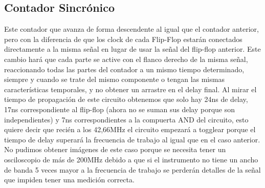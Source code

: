  



\subsection*{Contador Sincrónico}
Este contador que avanza de forma descendente al igual que el contador anterior, pero con la diferencia de que los clock de cada Flip-Flop estarán conectados directamente a la misma señal en lugar de usar la señal del flip-flop anterior. Este cambio hará que cada parte se active con el flanco derecho de la misma señal, reaccionando todas las partes del contador a un mismo tiempo determinado, siempre y cuando se trate del mismo componente o tengan las mismas características temporales, y no obtener un arrastre en el delay final.
\newline
Al mirar el tiempo de propagación de este circuito obtenemos que solo hay 24ns de delay, 17ns correspondiente al flip-flop (ahora no se suman sus delay porque son independientes) y 7ns correspondientes a la compuerta AND del circuito, esto quiere decir que recién a los 42,66MHz el circuito empezará a togglear porque el tiempo de delay superará la frecuencia de trabajo al igual que en el caso anterior. No pudimos obtener imágenes de este caso porque se necesita tener un osciloscopio de más de 200MHz debido a que si el instrumento no tiene un ancho de banda 5 veces mayor a la frecuencia de trabajo se perderán detalles de la señal que impiden tener una medición correcta.

